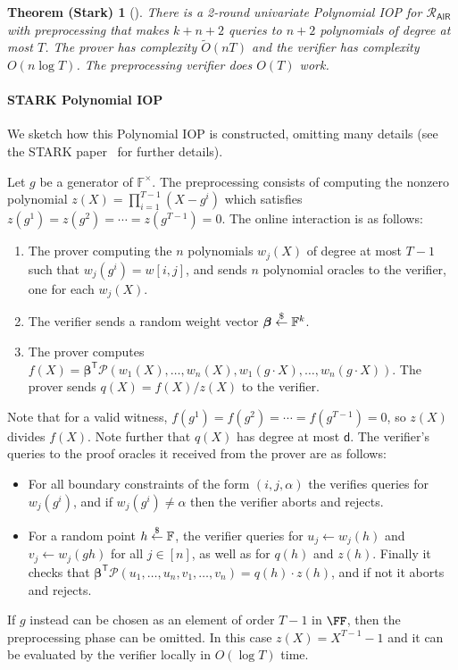 \newtheorem*{starktheorem}{Theorem (Stark)}
\begin{starktheorem}[\cite{C:BBHR19}]
There is a 2-round univariate Polynomial IOP for $\mathcal{R}_\mathsf{AIR}$ with preprocessing that makes $k+n+2$ queries to $n+2$ polynomials of degree at most $T$. The prover has complexity $\tilde{O}(nT)$ and the verifier has complexity $O(n \log T)$. The preprocessing verifier does $O(T)$ work.
\end{starktheorem}


\paragraph{\textsf{STARK} Polynomial IOP} We sketch how this Polynomial IOP is constructed, omitting many details (see the \textsf{STARK} paper~\cite{C:BBHR19} for further details).

Let $g$ be a generator of $\mathbb{F}^\times$. The preprocessing consists of computing the nonzero polynomial $z(X) = \prod_{i=1}^{T-1} (X-g^i)$ which satisfies $z(g^1) = z(g^2) = \cdots = z(g^{T-1}) = 0$. The online interaction is as follows: 
\begin{enumerate} 
\item The prover computing the $n$ polynomials $w_j(X)$ of degree at most $T-1$ such that $w_j(g^i) = w[i,j]$, and sends $n$ polynomial oracles to the verifier, one for each $w_j(X)$. 
\item The verifier sends a random weight vector $\boldsymbol{\beta} \overset{\$}{\gets} \mathbb{F}^k$.
\item  The prover computes $f(X) = \boldsymbol{\beta}^\mathsf{T} \boldsymbol{\mathcal{P}}(w_1(X), \ldots, w_n(X), w_1(g \cdot X), \ldots, w_n(g \cdot X))$. The prover sends $q(X) = f(X)/z(X)$ to the verifier.

\end{enumerate}

  Note that for a valid witness, $f(g^1) = f(g^2) = \cdots = f(g^{T-1}) = 0$, so $z(X)$ divides $f(X)$. Note further that $q(X)$ has degree at most $\mathsf{d}$. The verifier's queries to the proof oracles it received from the prover are as follows:
\begin{itemize}
    \item For all boundary constraints of the form $(i, j, \alpha)$ the verifies queries for $w_j(g^i)$, and if $w_j(g^i) \neq \alpha$ then the verifier aborts and rejects. %
    \item For a random point $h \overset{\$}{\gets} \mathbb{F}$, the verifier queries for $u_j \leftarrow w_j(h)$ and $v_j \leftarrow w_j(gh)$ for all $j \in [n]$, as well as for $q(h)$ and $z(h)$. %
    Finally it checks that $\boldsymbol{\beta}^\mathsf{T} \boldsymbol{\mathcal{P}}(u_1, \ldots, u_n, v_1, \ldots, v_n) = q(h) \cdot z(h)$, and if not it aborts and rejects.
\end{itemize}
If $g$ instead can be chosen as an element of order $T-1$ in $\FF$, then the preprocessing phase can be omitted. In this case $z(X) = X^{T-1} - 1$ and it can be evaluated by the verifier locally in $O(\log T)$ time.




